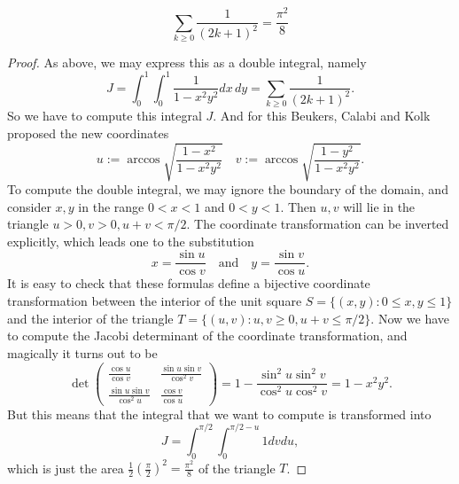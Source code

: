 \begin{theorem}
  \label{euler_series_2}
  \leanok
  \[
  \sum_{k \ge 0}\frac{1}{(2k+1)^2} = \frac{\pi^2}{8}
  \]
\end{theorem}
\begin{proof}
  As above, we may express this as a double integral, namely
  \[
  J = \int_0^1 \int_0^1 \frac{1}{1-x^2 y^2} dx \, dy = \sum_{k \ge 0} \frac{1}{(2k+1)^2}.
  \]
  So we have to compute this integral $J$.
  And for this Beukers, Calabi and Kolk proposed the new coordinates
  \[
  u := \arccos \sqrt{\frac{1-x^2}{1-x^2 y^2}} \quad v := \arccos \sqrt{\frac{1-y^2}{1-x^2 y^2}}.
  \]
  To compute the double integral, we may ignore the boundary of the domain, and consider $x, y$ in the range $0 < x < 1$ and $0 < y < 1$.
  Then $u, v$ will lie in the triangle $u > 0, v > 0, u+v < \pi/2$.
  The coordinate transformation can be inverted explicitly, which leads one to the substitution
  \[
  x = \frac{\sin u}{\cos v} \quad \text{and} \quad y = \frac{\sin v}{\cos u}.
  \]
  It is easy to check that these formulas define a bijective coordinate transformation between the interior of the unit square $S = \{(x, y) : 0 \le x, y \le 1\}$ and the interior of the triangle $T = \{(u, v) : u, v \ge 0, u+v \le \pi/2\}$.
  Now we have to compute the Jacobi determinant of the coordinate transformation, and magically it turns out to be
  \[
  \det \begin{pmatrix} \frac{\cos u}{\cos v} & \frac{\sin u \sin v}{\cos^2 v} \\ \frac{\sin u \sin v}{\cos^2 u} & \frac{\cos v}{\cos u} \end{pmatrix} = 1 - \frac{\sin^2 u \sin^2 v}{\cos^2 u \cos^2 v} = 1 - x^2 y^2.
  \]
  But this means that the integral that we want to compute is transformed into
  \[
  J = \int_0^{\pi/2} \int_0^{\pi/2-u} 1 dv du,
  \]
  which is just the area $\frac{1}{2} (\frac{\pi}{2})^2 = \frac{\pi^2}{8}$ of the triangle $T$.
\end{proof}


